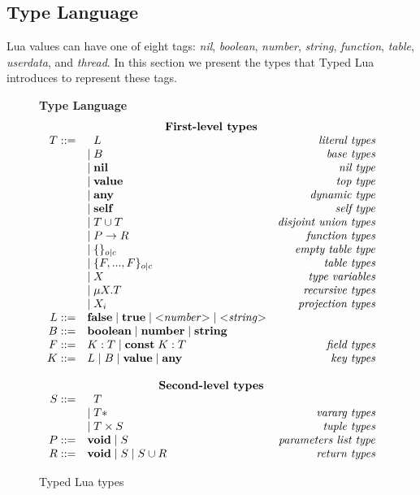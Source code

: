 \subsection{Type Language}
\label{sec:types}

Lua values can have one of eight tags:
\emph{nil}, \emph{boolean}, \emph{number}, \emph{string},
\emph{function}, \emph{table}, \emph{userdata}, and \emph{thread}.
In this section we present the types that Typed Lua introduces
to represent these tags.

\begin{figure}[!ht]
\textbf{Type Language}\\
\dstart
$$
\begin{array}{rlr}
\multicolumn{3}{c}{\textbf{First-level types}}\\
T ::= & \;\; L & \textit{literal types}\\
& | \; B & \textit{base types}\\
& | \; \Nil & \textit{nil type}\\
& | \; \Value & \textit{top type}\\
& | \; \Any & \textit{dynamic type}\\
& | \; \Self & \textit{self type}\\
& | \; T \cup T & \textit{disjoint union types}\\
& | \; P \rightarrow R & \textit{function types}\\
& | \; \{ \}_{o|c} & \textit{empty table type}\\
& | \; \{F, ..., F\}_{o|c} & \textit{table types}\\
& | \; X & \textit{type variables}\\
& | \; \mu X.T & \textit{recursive types}\\
& | \; X_{i} & \textit{projection types}\\
L ::= & \False \; | \; \True \; | \; {<}{\it number}{>} \; | \; {<}{\it string}{>} & \\
B ::= & \Boolean \; | \; \Number \; | \; \String & \\
F ::= & K:T \; | \; \Const \; K:T & \textit{field types}\\ 
K ::= & L \; | \; B \; | \; \Value \; | \; \Any & \textit{key types}\\
\multicolumn{3}{c}{}\\
\multicolumn{3}{c}{\textbf{Second-level types}}\\
S ::= & \;\; T &\\
& | \; T* & \textit{vararg types}\\
& | \; T \times S & \textit{tuple types}\\
P ::= & \Void \; | \; S & \textit{parameters list type}\\
R ::= & \Void \; | \; S \; | \; S \cup R & \textit{return types}\\
\end{array}
$$
\dend
\caption{Typed Lua types}
\label{fig:typelang}
\end{figure}

